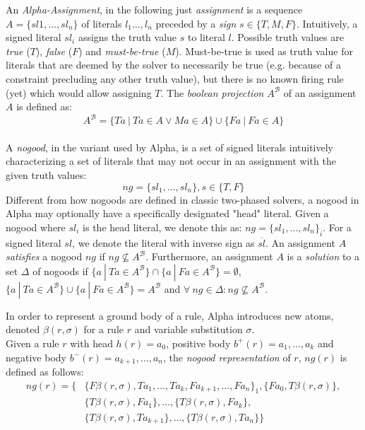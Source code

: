 \begin{definition}
\label{def:prelims-alpha-nogood}	
An \emph{Alpha-Assignment}, in the following just \emph{assignment} is a sequence $A = \{sl1,\ldots,sl_n\}$ of literals $l_1\ldots,l_n$ preceded by a \emph{sign} $s \in \{T, M, F\}$. Intuitively, a signed literal $sl_i$ assigns the truth value $s$ to literal $l$. Possible truth values are \emph{true} ($T$), \emph{false} ($F$) and \emph{must-be-true} ($M$). Must-be-true is used as truth value for literals that are deemed by the solver to necessarily be true (e.g. because of a constraint precluding any other truth value), but there is no known firing rule (yet) which would allow assigning $T$. The \emph{boolean projection} $A^{\mathcal{B}}$ of an assignment $A$ is defined as: 
\[
	A^{\mathcal{B}} = \{ Ta~|~Ta \in A \lor Ma \in A\} \cup \{ Fa~|~Fa \in A\}
\]
\\
A \emph{nogood}, in the variant used by Alpha, is a set of signed literals intuitively characterizing a set of literals that may not occur in an assignment with the given truth values:
\[
	ng = \{ sl_1,\ldots,sl_n \}, s \in \{T, F\}
\]
Different from how nogoods are defined in classic two-phased solvers, a nogood in Alpha may optionally have a specifically designated "head" literal. Given a nogood where $sl_i$ is the head literal, we denote this as: $ng = \{ sl_1,\ldots,sl_n \}_i$. For a signed literal $sl$, we denote the literal with inverse sign as $\overline{sl}$.
An assignment $A$ \emph{satisfies} a nogood $ng$ if $ng \nsubseteq A^{\mathcal{B}}$. Furthermore, an assignment $A$ is a \emph{solution} to a set $\Delta$ of nogoods if $\{a~|~Ta \in A^{\mathcal{B}}\} \cap \{a~|~Fa \in A^{\mathcal{B}}\} = \emptyset$,  $\{a~|~Ta \in A^{\mathcal{B}}\} \cup \{a~|~Fa \in A^{\mathcal{B}}\} = A^{\mathcal{B}}$ and $\forall~ng \in \Delta: ng \nsubseteq A^{\mathcal{B}}$.
\end{definition}

\begin{definition}
\label{def:prelims-alpha-nogood-ruleencoding}		
In order to represent a ground body of a rule, Alpha introduces new atoms, denoted $\beta(r,\sigma)$ for a rule $r$ and variable substitution $\sigma$.\\
Given a rule $r$ with head $h(r) = a_0$, positive body $b^{+}(r) = a_1,\ldots,a_k$ and negative body $b^{-}(r) = a_{k+1},\ldots,a_n$, the \emph{nogood representation} of $r$, $ng(r)$ is defined as follows:
\begin{align*}
	ng(r) = \{&\{F\beta(r,\sigma),Ta_1,\ldots,Ta_k,Fa_{k+1},\ldots,Fa_n\}_1,\{Fa_0,T\beta(r,\sigma)\},\\
			  &\{T\beta(r,\sigma),Fa_1\},\ldots,\{T\beta(r,\sigma),Fa_k\},\\
			  &\{T\beta(r,\sigma),Ta_{k+1}\},\ldots,\{T\beta(r,\sigma),Ta_n\}\}
\end{align*}	
\end{definition}


